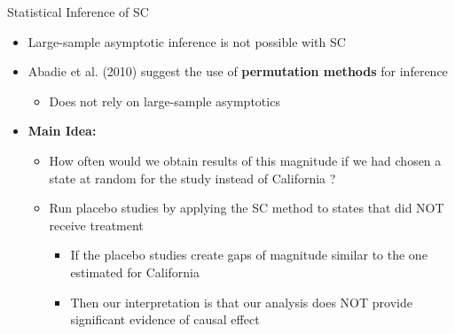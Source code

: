 \documentclass[dvipsnames,hyperref={pdfpagelabels=false}]{beamer}
\begin{document}
\begin{frame}{Statistical Inference of SC}
\begin{itemize}
\item Large-sample asymptotic inference is not possible with SC
\vspace{0.2cm}
\item Abadie et al. (2010) suggest the use of \textbf{permutation methods} for inference 
\vspace{0.2cm}
	\begin{itemize}
	\item Does not rely on large-sample asymptotics
\end{itemize}
\vspace{0.2cm}
\item \textbf{Main Idea:} 
\vspace{0.2cm}
\begin{itemize}
\item How often would we obtain results of this magnitude if we had chosen a state at random for the study instead of California ?
\vspace{0.2cm}

\item Run placebo studies by applying the SC method to states that did NOT receive treatment
\vspace{0.2cm}
\begin{itemize}
\item  If the placebo studies create gaps of magnitude similar to the one estimated for California 
\vspace{0.2cm}
\item Then our interpretation is that
our analysis does NOT provide significant evidence of causal effect
\end{itemize}
\end{itemize}
\end{itemize}
\end{frame}
\end{document}
